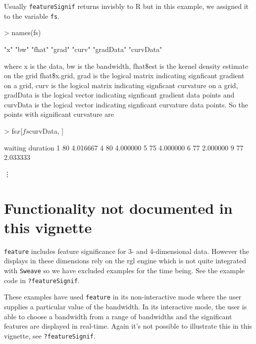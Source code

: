 \documentclass[a4paper]{article}
\begin{document}
\clearpage
Usually \texttt{featureSignif} 
returns invisbly to R but in this example, we assigned it to the variable 
\texttt{fs}.
\begin{Schunk}
\begin{Sinput}
> names(fs)
\end{Sinput}
\begin{Soutput}
[1] "x"        "bw"       "fhat"     "grad"     "curv"     "gradData" "curvData"
\end{Soutput}
\end{Schunk}
where x is the data, bw is the bandwidth, fhat\$est is the kernel density estimate
on the grid fhat\$x.grid, 
grad is the logical matrix indicating signficant gradient on a grid, 
curv is the logical matrix indicating signficant curvature on a grid,
gradData is the logical vector indicating signficant gradient data points and 
curvData is the logical vector indicating signficant curvature data points.
So the points with significant curvature are 
\begin{Schunk}
\begin{Sinput}
> fs$x[fs$curvData, ]
\end{Sinput}
\end{Schunk}
\begin{Schunk}
\begin{Soutput}
  waiting duration
1      80 4.016667
4      80 4.000000
5      75 4.000000
6      77 2.000000
9      77 2.033333
\end{Soutput}
\end{Schunk}
\vdots

\section{Functionality not documented in this vignette}

\texttt{feature} includes 
feature significance for 3- and 4-dimensional
data. However the displays in these dimensions rely on the rgl \cite{rgl}
engine which is not quite integrated with \texttt{Sweave} 
so we have excluded examples for the time being. See 
the example code in \texttt{?featureSignif}.   


These examples have used \texttt{feature} in its non-interactive
mode where the user supplies a particular value of the bandwidth. 
In its interactive mode, the user is able to choose a
bandwidth from a range of bandwidths and the significant features are
displayed in real-time.
Again it's not possible to illustrate this in this vignette,
see \texttt{?featureSignif}.   
 
\end{document}
